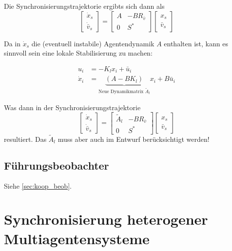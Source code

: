 Die Synchronisierungstrajektorie ergibts sich dann als
\begin{equation}
    \begin{bmatrix}
        \dot{x}_s \\ \dot{\bar{v}}_s
    \end{bmatrix}
    =
    \begin{bmatrix}
        A & -BR_{\bar{v}} \\
        0 & S^*
    \end{bmatrix}
    \begin{bmatrix}
        x_s \\ \bar{v}_s
    \end{bmatrix}
\end{equation}

Da in $\dot{x}_s$ die (eventuell instabile) Agentendynamik $A$ enthalten ist, kann es
sinnvoll sein eine lokale Stabilisierung zu machen:

\begin{align}
    u_i &= -K_l x_i + \bar{u}_i \\
    \dot{x}_i &= \underbrace{(A-BK_l)}_{\text{Neue Dynamikmatrix }\tilde{A}_l}x_i + B\bar{u}_i
\end{align}

Was dann in der Synchronisierungstrajektorie
\begin{equation}
    \begin{bmatrix}
        \dot{x}_s \\ \dot{\bar{v}}_s
    \end{bmatrix}
    =
    \begin{bmatrix}
        \tilde{A}_l & -BR_{\bar{v}} \\
        0 & S^*
    \end{bmatrix}
    \begin{bmatrix}
        x_s \\ \bar{v}_s
    \end{bmatrix}
\end{equation}
resultiert. Das $\tilde{A}_l$ muss aber auch im Entwurf berücksichtigt werden!


\subsection{Führungsbeobachter}
Siehe \ref{sec:koop_beob}.

\pagebreak
\section{Synchronisierung heterogener Multiagentensysteme}

